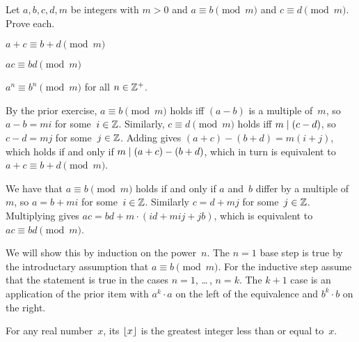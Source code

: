 \documentclass{ibl}
\begin{document}
\begin{ex}
Let $a,b,c,d,m$ be integers with $m>0$ and
$a\equiv b\pmod m$ and $c\equiv d\pmod m$.
Prove each.
\begin{exes}
\item $a+c\equiv b+d\pmod m$
\item $ac\equiv bd\pmod m$
\item $a^n\equiv b^n\pmod m$ for all $n\in\mathbb{Z}^+$.
\end{exes}
\begin{ans}
\begin{exes}
\item By the prior exercise, $a\equiv b\pmod m$ holds iff 
  $(a-b)$ is a multiple of~$m$, 
  so $a-b=mi$ for some~$i\in\mathbb{Z}$.
  Similarly, $c\equiv d\pmod m$ holds iff $m\mid (c-d)$, 
  so $c-d=mj$ for some~$j\in\mathbb{Z}$.
  Adding gives $(a+c)-(b+d)=m(i+j)$, which holds if and only if
  $m\mid (a+c)-(b+d)$, which in turn is equivalent to
  $a+c\equiv b+d\pmod m$.
\item We have that $a\equiv b\pmod m$ holds if and only if
  $a$ and~$b$ differ by a multiple of~$m$, so 
  $a=b+mi$ for some~$i\in\mathbb{Z}$. 
  Similarly $c=d+mj$ for some~$j\in\mathbb{Z}$.
  Multiplying gives $ac=bd+m\cdot(id+mij+jb)$, 
  which is equivalent to $ac\equiv bd\pmod m$. 
\item We will show this by induction on the power~$n$.
  The $n=1$ base step is true by the introductary assumption that 
  $a\equiv b\pmod m$.
  For the inductive step assume that the statement is true in the cases
  $n=1$, \ldots\,, $n=k$.
  The $k+1$ case is an application of the prior item with 
  $a^k\cdot a$ on the left of the equivalence and $b^k\cdot b$ on the
  right.
\end{exes}
\end{ans}
\end{ex}

\begin{df}
For any real number~$x$,
its  $\lfloor x \rfloor$ is
the greatest integer less than or equal to~$x$.  
\end{df}
\end{document}
